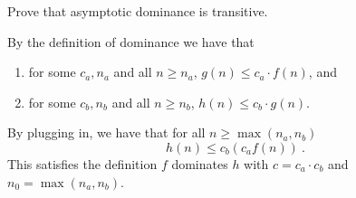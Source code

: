 \begin{flex}
\label{grp:xrcs:analysis::asymptotics::asymptotic}

\begin{exercise}
\label{xrcs:analysis::asymptotics::asymptotic}
    Prove that asymptotic dominance is transitive.
  

\end{exercise}

\begin{solution}
\label{sol:analysis::asymptotics::dominance}
    By the definition of dominance we have that 
    \begin{enumerate}
    \item 
      for some $c_a, n_a$ and all $n \geq n_a$,  $g(n) \leq c_a \cdot f(n)$,
      and
    \item
      for some $c_b, n_b$ and all $n \geq n_b$,  $h(n) \leq c_b \cdot g(n)$.
    \end{enumerate}
    By plugging in, we have that for all $n \geq \max(n_a,n_b)$
    \[h(n) \leq c_b (c_a f(n))~.\]
    This satisfies the definition  $f$ dominates $h$ with $c = c_a
    \cdot c_b$ and $n_0 = \max(n_a,n_b)$.
  

\end{solution}
\end{flex}

